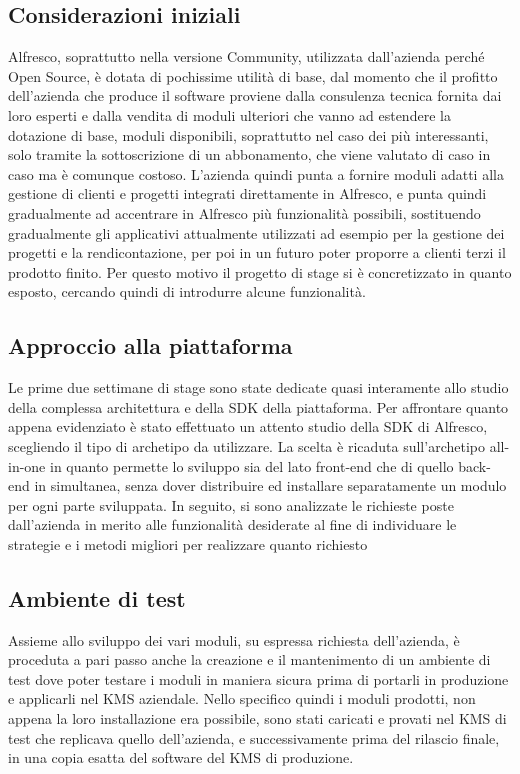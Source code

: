 \subsection{Considerazioni iniziali}
Alfresco, soprattutto nella versione Community, utilizzata dall'azienda perché Open Source, è dotata di pochissime utilità di base, dal momento che il profitto dell'azienda che produce il software proviene dalla consulenza tecnica fornita dai loro esperti e dalla vendita di moduli ulteriori che vanno ad estendere la dotazione di base, moduli disponibili, soprattutto nel caso dei più interessanti, solo tramite la sottoscrizione di un abbonamento, che viene valutato di caso in caso ma è comunque costoso. L'azienda quindi punta a fornire moduli adatti alla gestione di clienti e progetti integrati direttamente in Alfresco, e punta quindi gradualmente ad accentrare in Alfresco più funzionalità possibili, sostituendo gradualmente gli applicativi attualmente utilizzati ad esempio per la gestione dei progetti e la rendicontazione, per poi in un futuro poter proporre a  clienti terzi il prodotto finito. Per questo motivo il progetto di stage si è concretizzato in quanto esposto, cercando quindi di introdurre alcune funzionalità.
\subsection{Approccio alla piattaforma}
Le prime due settimane di stage sono state dedicate quasi interamente allo studio della complessa architettura
e della SDK della piattaforma.
Per affrontare quanto appena evidenziato è stato effettuato un attento studio
della SDK di Alfresco, scegliendo il tipo di archetipo da utilizzare. La scelta è
ricaduta sull’archetipo all-in-one in quanto permette lo sviluppo sia del lato front-end
che di quello back-end in simultanea, senza dover distribuire ed installare separatamente un modulo per ogni parte sviluppata.
In seguito, si sono analizzate le richieste poste dall'azienda in merito alle funzionalità desiderate al fine di individuare le strategie e i metodi migliori per realizzare quanto richiesto
\subsection{Ambiente di test}
Assieme allo sviluppo dei vari moduli, su espressa richiesta dell’azienda, è proceduta a pari passo anche la creazione e il mantenimento di un ambiente di test dove poter testare i moduli in maniera sicura prima di portarli in produzione e applicarli nel \gls{KMS} aziendale. Nello specifico quindi i moduli prodotti, non appena la loro installazione era possibile, sono stati caricati e provati nel \gls{KMS} di test che replicava quello dell'azienda, e successivamente prima del rilascio finale, in una copia esatta del software del \gls{KMS} di produzione.
